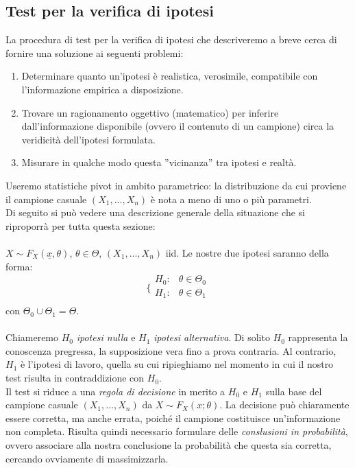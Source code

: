 \subsection{Test per la verifica di ipotesi}

La procedura di test per la verifica di ipotesi che descriveremo a breve cerca di fornire una soluzione ai seguenti problemi:
\begin{enumerate}
\item Determinare quanto un'ipotesi è realistica, verosimile, compatibile con l'informazione empirica a disposizione.
\item Trovare un ragionamento oggettivo (matematico) per inferire dall'informazione disponibile (ovvero il contenuto di un campione) circa la veridicità dell'ipotesi formulata.
\item Misurare in qualche modo questa ''vicinanza'' tra ipotesi e realtà.
\end{enumerate}
Useremo statistiche pivot in ambito parametrico: la distribuzione da cui proviene il campione casuale $(X_1,...,X_n)$ è nota a meno di uno o più parametri.\\
Di seguito si può vedere una descrizione generale della situazione che si riproporrà per tutta questa sezione:\\
\\
$X \sim F_X(\underline{x},\theta)$, $\theta \in \Theta$, $(X_1,...,X_n)$ iid. Le nostre due ipotesi saranno della forma:
$$\bigg \{
\begin{array}{rl}
H_0: & \theta \in \Theta_0 \\
H_1: & \theta \in \Theta_1 \\
\end{array}
$$
con $\Theta_0 \cup \Theta_1 = \Theta$.\\
\\
Chiameremo $H_0$ \textit{ipotesi nulla} e $H_1$ \textit{ipotesi alternativa}. Di solito $H_0$ rappresenta la conoscenza pregressa, la supposizione vera fino a prova contraria. Al contrario, $H_1$ è l'ipotesi di lavoro, quella su cui ripieghiamo nel momento in cui il nostro test risulta in contraddizione con $H_0$.\\
Il test si riduce a una \textit{regola di decisione} in merito a $H_0$ e $H_1$ sulla base del campione casuale $(X_1,...,X_n)$ da $X \sim F_X (x;\theta)$. La decisione può chiaramente essere corretta, ma anche errata, poiché il campione costituisce un'informazione non completa. Risulta quindi necessario formulare delle \textit{conslusioni in probabilità}, ovvero associare alla nostra conclusione la probabilità che questa sia corretta, cercando ovviamente di massimizzarla.\\
